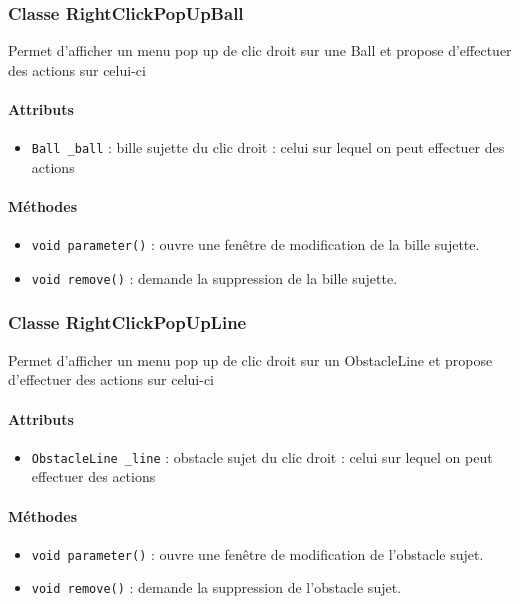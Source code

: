 \documentclass{report}
\begin{document}
\subsubsection{Classe RightClickPopUpBall}

Permet d'afficher un menu pop up de clic droit sur une Ball et propose d'effectuer des actions sur celui-ci

\paragraph*{Attributs}
\begin{itemize}
\item \texttt{Ball \_ball} : bille sujette du clic droit : celui sur lequel on peut effectuer des actions
\end{itemize}

\paragraph*{Méthodes}
\begin{itemize}
\item \texttt{void parameter()} : ouvre une fenêtre de modification de la bille sujette.
\item \texttt{void remove()} : demande la suppression de la bille sujette.
\end{itemize}

\subsubsection{Classe RightClickPopUpLine}

Permet d'afficher un menu pop up de clic droit sur un ObstacleLine et propose d'effectuer des actions sur celui-ci

\paragraph*{Attributs}
\begin{itemize}
\item \texttt{ObstacleLine \_line} : obstacle sujet du clic droit : celui sur lequel on peut effectuer des actions
\end{itemize}

\paragraph*{Méthodes}
\begin{itemize}
\item \texttt{void parameter()} : ouvre une fenêtre de modification de l'obstacle sujet.
\item \texttt{void remove()} : demande la suppression de l'obstacle sujet.
\end{itemize}
\end{document}
